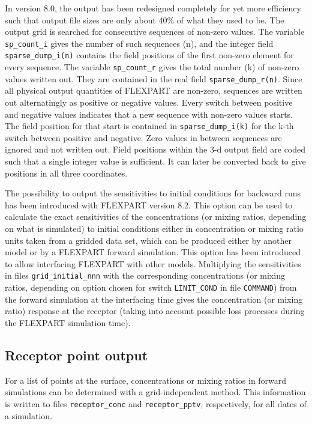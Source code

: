 \documentclass{egu}                  %
\begin{document}
In version 8.0, the output has been redesigned completely for yet more efficiency
such that output file sizes are only about 40\% of what they used to be.  The
output grid is searched for consecutive sequences of non-zero values.  The
variable \verb|sp_count_i| gives the number of such sequences (n), and the
integer field \verb|sparse_dump_i(n)| contains the field positions of the first
non-zero element for every sequence.  The variable \verb|sp_count_r| gives the
total number (k) of non-zero values written out.  They are contained in the
real field \verb|sparse_dump_r(n)|.  Since all physical output quantities of
FLEXPART are non-zero, sequences are written out alternatingly as positive or
negative values.  Every switch between positive and negative values indicates
that a new sequence with non-zero values starts.  The field position for that
start is contained in \verb|sparse_dump_i(k)| for the k-th switch between
positive and negative.  Zero values in between sequences are ignored and not
written out.  Field positions within the 3-d output field are coded such that a
single integer value is sufficient.  It can later be converted back to give
positions in all three coordinates.

The possibility to output the sensitivities to initial conditions for backward
runs has been introduced with FLEXPART version 8.2. This option can be used to
calculate the exact sensitivities of the concentrations (or mixing ratios,
depending on what is simulated) to initial conditions either in concentration
or mixing ratio units taken from a gridded data set, which can be produced
either by another model or by a FLEXPART forward simulation.  This option has
been introduced to allow interfacing FLEXPART with other models.  Multiplying
the sensitivities in files \verb|grid_initial_nnn| with the corresponding
concentrations (or mixing ratios, depending on option chosen for switch
\verb|LINIT_COND| in file \verb|COMMAND|) from the forward simulation at the
interfacing time gives the concentration (or mixing ratio) response at the
receptor (taking into account possible loss processes during the FLEXPART
simulation time).

\subsection{Receptor point output}

For a list of points at the surface, concentrations or mixing ratios in forward
simulations can be determined with a grid-independent method.  This information
is written to files \verb|receptor_conc| and \verb|receptor_pptv|,
respectively, for all dates of a simulation.
\end{document}
